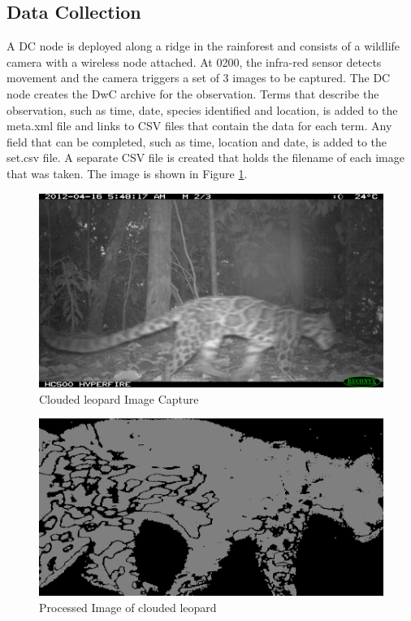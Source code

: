 		\subsection{Data Collection}
			A DC node is deployed along a ridge in the rainforest and consists of a wildlife camera with a wireless node attached. At 0200, the infra-red sensor detects movement and the camera triggers a set of 3 images to be captured. The DC node creates the DwC archive for the observation. Terms that describe the observation, such as time, date, species identified and location, is added to the meta.xml file and links to CSV files that contain the data for each term. Any field that can be completed, such as time, location and date, is added to the set.csv file. A separate CSV file is created that holds the filename of each image that was taken. The image is shown in Figure \ref{cl2}.
			
			\begin{figure}[!t]
			\centering
			\includegraphics[width=\textwidth]{Chap4/figures/leopard2.JPG}
			\caption{Clouded leopard Image Capture}
			\label{cl2}
			\end{figure}

			\begin{figure}[!t]
			\centering
			\includegraphics[width=\textwidth]{Chap4/figures/leopard_proc}
			\caption{Processed Image of clouded leopard}
			\label{clproc}
			\end{figure}
			
